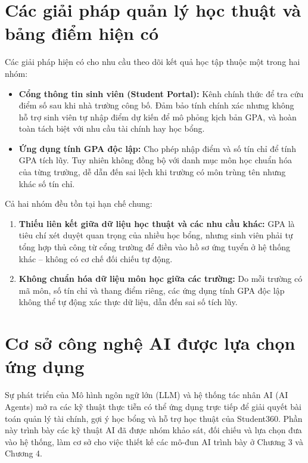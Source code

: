 \section{Các giải pháp quản lý học thuật và bảng điểm hiện có}
\label{sec:giai-phap-hoc-thuat-hien-co}
Các giải pháp hiện có cho nhu cầu theo dõi kết quả học tập thuộc một trong hai nhóm:
\begin{itemize}
    \item \textbf{Cổng thông tin sinh viên (Student Portal):} Kênh chính thức để tra cứu điểm số sau khi nhà trường công bố. Đảm bảo tính chính xác nhưng không hỗ trợ sinh viên tự nhập điểm dự kiến để mô phỏng kịch bản GPA, và hoàn toàn tách biệt với nhu cầu tài chính hay học bổng.
    \item \textbf{Ứng dụng tính GPA độc lập:} Cho phép nhập điểm và số tín chỉ để tính GPA tích lũy. Tuy nhiên không đồng bộ với danh mục môn học chuẩn hóa của từng trường, dễ dẫn đến sai lệch khi trường có môn trùng tên nhưng khác số tín chỉ.
\end{itemize}

Cả hai nhóm đều tồn tại hạn chế chung:
\begin{enumerate}
    \item \textbf{Thiếu liên kết giữa dữ liệu học thuật và các nhu cầu khác:} GPA là tiêu chí xét duyệt quan trọng của nhiều học bổng, nhưng sinh viên phải tự tổng hợp thủ công từ cổng trường để điền vào hồ sơ ứng tuyển ở hệ thống khác -- không có cơ chế đối chiếu tự động.
    \item \textbf{Không chuẩn hóa dữ liệu môn học giữa các trường:} Do mỗi trường có mã môn, số tín chỉ và thang điểm riêng, các ứng dụng tính GPA độc lập không thể tự động xác thực dữ liệu, dẫn đến sai số tích lũy.
\end{enumerate}

\section{Cơ sở công nghệ AI được lựa chọn ứng dụng}
\label{sec:nghien-cuu-lien-quan}
Sự phát triển của Mô hình ngôn ngữ lớn (LLM) và hệ thống tác nhân AI (AI Agents) mở ra các kỹ thuật thực tiễn có thể ứng dụng trực tiếp để giải quyết bài toán quản lý tài chính, gợi ý học bổng và hỗ trợ học thuật của Student360. Phần này trình bày các kỹ thuật AI đã được nhóm khảo sát, đối chiếu và lựa chọn đưa vào hệ thống, làm cơ sở cho việc thiết kế các mô-đun AI trình bày ở Chương 3 và Chương 4.

